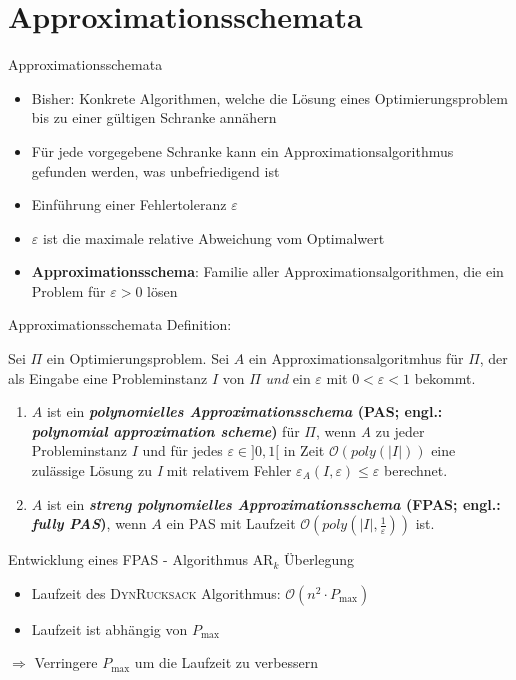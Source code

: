\section{Approximationsschemata}
\begin{frame}{Approximationsschemata}


\begin{itemize}
\item Bisher: Konkrete Algorithmen, welche die Lösung eines Optimierungsproblem bis zu einer gültigen Schranke annähern
\item Für jede vorgegebene Schranke kann ein Approximationsalgorithmus gefunden werden, was unbefriedigend ist
\item Einführung einer Fehlertoleranz $\varepsilon$
\item $\varepsilon$ ist die maximale relative Abweichung vom Optimalwert
\item \textbf{Approximationsschema}: Familie aller Approximationsalgorithmen, die ein Problem für $\varepsilon > 0$ lösen
\end{itemize}
\end{frame}

\begin{frame}{Approximationsschemata}	
    Definition:
			
Sei $\Pi$ ein Optimierungsproblem. Sei $A$ ein Approximationsalgoritmhus für $\Pi$, der als Eingabe eine Probleminstanz $I$ von $\Pi$ \textit{und} ein $\varepsilon$ mit $0 < \varepsilon < 1$ bekommt.

\begin{enumerate}
\item
$A$ ist ein \textbf{\textit{polynomielles Approximationsschema} (PAS; engl.: \textit{polynomial approximation scheme})} für $\Pi$, wenn \textit{A} zu jeder Probleminstanz $I$ und für jedes $\varepsilon \in ] 0,1 [$ in Zeit $\mathcal O(poly(|I|))$ eine zulässige Lösung zu \textit{I} mit relativem Fehler $\varepsilon_A(\textit{I},\varepsilon) \le \varepsilon$ berechnet.

\item
$A$ ist ein \textbf{\textit{streng polynomielles Approximationsschema} (FPAS; engl.: \textit{fully PAS})}, wenn $A$ ein PAS mit Laufzeit $\mathcal O(poly(|I|, \frac{1}{\varepsilon}))$ ist.

\end{enumerate}		      
\end{frame}

\begin{frame}{Entwicklung eines FPAS - Algorithmus $\text{AR}_k$ Überlegung}	
	\begin{itemize}
		\item 
		Laufzeit des \textsc{DynRucksack} Algorithmus: $\mathcal O(n^2 \cdot P_{\max})$ 
		\item
		Laufzeit ist abhängig von $P_{\max}$
	\end{itemize}
	$\Rightarrow$ Verringere $P_{\max}$ um die Laufzeit zu verbessern
\end{frame}

